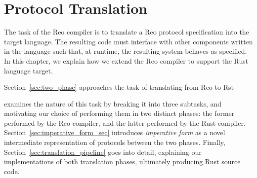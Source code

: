 \chapter{Protocol Translation}
\label{sec:imperative_form}

The task of the Reo compiler is to translate a Reo protocol specification into the target language. The resulting code must interface with other components written in the language such that, at runtime, the resulting system behaves as specified. In this chapter, we explain how we extend the Reo compiler to support the Rust language target.

Section~\ref{sec:two_phase} approaches the task of translating from Reo to Rst

examines the nature of this task by breaking it into three subtasks, and motivating our choice of performing them in two distinct phases: the former performed by the Reo compiler, and the latter performed by the Rust compiler. Section~\ref{sec:imperative_form_sec} introduces \textit{imperative form} as a novel intermediate representation of protocols between the two phases. Finally, Section~\ref{sec:translation_pipeline} goes into detail, explaining our implementations of both translation phases, ultimately producing Rust source code.

%	
%	
%	

